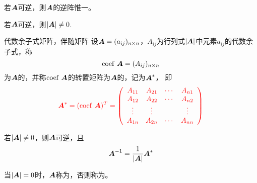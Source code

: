 \begin{frame}
\begin{dingli}
  若$\boldsymbol{A}$可逆，则$\boldsymbol{A}$的逆阵惟一。
\end{dingli}

\begin{dingli}
  若$\boldsymbol{A}$可逆，则$|\boldsymbol{A}|\ne 0$.
\end{dingli}

\end{frame}

\begin{frame}
\begin{dingyi}{代数余子式矩阵，伴随矩阵}
  设$\boldsymbol{A}=(a_{ij})_{n\times n}$，$A_{ij}$为行列式$|\boldsymbol{A}|$中元素$a_{ij}$的代数余子式，称
  $$
  \mathrm{coef}~ \boldsymbol{A} = (A_{ij})_{n\times n}
  $$
  为$\boldsymbol{A}$的，并称$\mathrm{coef}~ \boldsymbol{A}$的转置矩阵为$\boldsymbol{A}$的，记为$\boldsymbol{A}^*$，
  即
  $$\textcolor{red}{
    \boldsymbol{A}^* = (\mathrm{coef}~\boldsymbol{A})^T = \left(
      \begin{array}{cccc}
        A_{11} & A_{21} & \cdots & A_{n1} \\
        A_{12} & A_{22} & \cdots & A_{n2} \\
        \vdots   & \vdots   &     & \vdots   \\
        A_{1n} & A_{2n} & \cdots & A_{nn} \\
      \end{array}
    \right)
  }
  $$
\end{dingyi}
\end{frame}

\begin{frame}
\begin{dingli}
  若$|\boldsymbol{A}|\ne 0$，则$\boldsymbol{A}$可逆，且
  $$
  \boldsymbol{A}^{-1} = \frac1{|\boldsymbol{A}|} \boldsymbol{A}^*
  $$
\end{dingli}
\end{frame}

\begin{frame}
\begin{dingyi}[奇异阵与非奇异阵]
  当$|\boldsymbol{A}|=0$时，$\boldsymbol{A}$称为，否则称为。
\end{dingyi}

\begin{zhu*}
\end{zhu*}

\end{frame}

